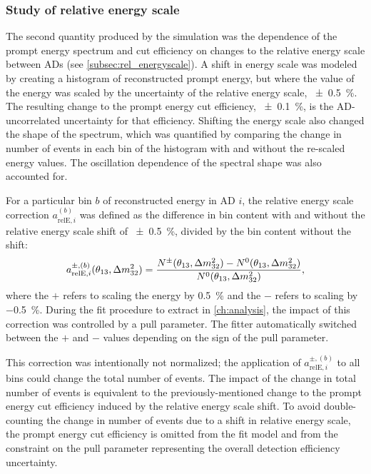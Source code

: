 \subsubsection{Study of relative energy scale}

The second quantity produced by the simulation
was the dependence of the prompt energy spectrum and cut efficiency
on changes to the relative energy scale between ADs (see \cref{subsec:rel_energyscale}).
A shift in energy scale was modeled by
creating a histogram of reconstructed prompt energy,
but where the value of the energy was scaled
by the uncertainty of the relative energy scale, \SI{\pm0.5}{\percent}.
The resulting change to the prompt energy cut efficiency, \SI{\pm0.1}{\percent},
is the AD-uncorrelated uncertainty for that efficiency.
Shifting the energy scale also changed the shape of the spectrum,
which was quantified by comparing the change in number of events
in each bin of the histogram with and without the re-scaled energy values.
The oscillation dependence of the spectral shape was also accounted for.

For a particular bin $b$ of reconstructed energy in AD $i$,
the relative energy scale correction $a_{\text{relE},i}^{(b)}$
was defined as the difference in bin content with and without
the relative energy scale shift of \SI{\pm0.5}{\percent},
divided by the bin content without the shift:
\begin{equation}
    a_{\text{relE},i}^{\pm,(b)}(\thetaot, \Delta m^2_{32}) =
    \frac{N^\pm(\thetaot, \Delta m^2_{32}) - N^0(\thetaot, \Delta m^2_{32})}%
    {N^0(\thetaot, \Delta m^2_{32})},
\end{equation}
where the $+$ refers to scaling the energy by \SI[retain-explicit-plus]{+0.5}{\percent}
and the $-$ refers to scaling by \SI{-0.5}{\percent}.
During the fit procedure to extract \thetaot{} in \cref{ch:analysis}, the impact of this correction
was controlled by a pull parameter.
The fitter automatically switched between the $+$ and $-$ values
depending on the sign of the pull parameter.

This correction was intentionally not normalized;
the application of $a_{\text{relE},i}^{\pm,(b)}$ to all bins
could change the total number of events.
The impact of the change in total number of events
is equivalent to the previously-mentioned change
to the prompt energy cut efficiency induced by the relative energy scale shift.
To avoid double-counting the change in number of events
due to a shift in relative energy scale,
the prompt energy cut efficiency is omitted
from the fit model and from the constraint
on the pull parameter representing the overall detection efficiency uncertainty.


